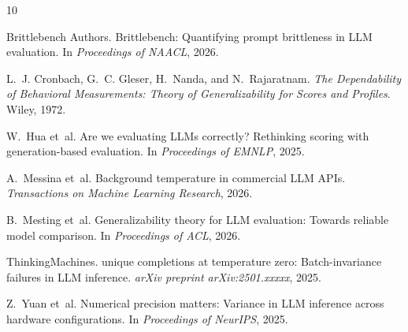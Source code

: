 \documentclass[letterpaper,11pt]{article}
\begin{document}
\begin{thebibliography}{10}

Brittlebench Authors.
\newblock Brittlebench: Quantifying prompt brittleness in LLM evaluation.
\newblock In \emph{Proceedings of NAACL}, 2026.

L.~J. Cronbach, G.~C. Gleser, H.~Nanda, and N.~Rajaratnam.
\newblock \emph{The Dependability of Behavioral Measurements: Theory of Generalizability for Scores and Profiles}.
\newblock Wiley, 1972.

W.~Hua et~al.
\newblock Are we evaluating LLMs correctly? Rethinking scoring with generation-based evaluation.
\newblock In \emph{Proceedings of EMNLP}, 2025.

A.~Messina et~al.
\newblock Background temperature in commercial LLM APIs.
\newblock \emph{Transactions on Machine Learning Research}, 2026.

B.~Mesting et~al.
\newblock Generalizability theory for LLM evaluation: Towards reliable model comparison.
\newblock In \emph{Proceedings of ACL}, 2026.

ThinkingMachines.
 unique completions at temperature zero: Batch-invariance failures in LLM inference.
\newblock \emph{arXiv preprint arXiv:2501.xxxxx}, 2025.

Z.~Yuan et~al.
\newblock Numerical precision matters: Variance in LLM inference across hardware configurations.
\newblock In \emph{Proceedings of NeurIPS}, 2025.

\end{thebibliography}
\end{document}
